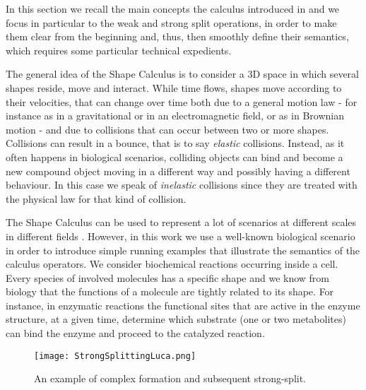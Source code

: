 \documentclass[11pt]{article}
\begin{document}
In this section we recall the main concepts the calculus introduced in \cite{Bartocci2010} and we focus in particular to the weak and strong split operations, in order to make them clear from the beginning and, thus, then smoothly define their semantics, which requires some particular technical expedients.

The general idea of the Shape Calculus is to consider a 3D space in which several shapes reside, move and interact. While time flows, shapes move according to their velocities, that can change over time both due to a general motion law - for instance as in a gravitational or in an electromagnetic field, or as in Brownian motion - and due to collisions that can occur between two or more shapes. Collisions can result in a bounce, that is to say {\em elastic} collisions. Instead, as it often happens in biological scenarios, colliding objects can bind and become a new compound object moving in a different way and possibly having a different behaviour. In this case we speak of {\em inelastic} collisions since they are treated with the physical law for that kind of collision.

The Shape Calculus can be used to represent a lot of scenarios at different scales in different fields \cite{Bartocci2010}. However, in this work we use a well-known biological scenario in order to introduce simple running examples that illustrate the semantics of the calculus operators. We consider biochemical reactions occurring inside a cell. Every species of involved molecules has a specific shape and we know from biology that the functions of a molecule are tightly related to its shape. For instance, in enzymatic reactions the functional sites that are active in the enzyme structure, at a given time, determine which substrate (one or two metabolites) can bind the enzyme and proceed to the catalyzed reaction.

\begin{figure}[t]
\begin{center}
\texttt{[image: StrongSplittingLuca.png]}
\end{center}
\caption{An example of complex formation and subsequent strong-split.}
\label{fig:StrongSplitting}
\end{figure}
\end{document}
